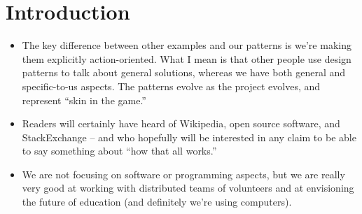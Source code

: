 \section{Introduction}

\begin{itemize}
\item The key difference between other examples and our
patterns is we're making them explicitly action-oriented.  What I mean
is that other people use design patterns to talk about general
solutions, whereas we have both general and specific-to-us aspects.
The patterns evolve as the project evolves, and represent ``skin in the game.''
\item Readers will certainly have heard of Wikipedia, open source
software, and StackExchange -- and who hopefully will be interested in
any claim to be able to say something about ``how that all works.''
\item We are not focusing on software or programming aspects, but we
are really very good at working with distributed teams of volunteers and
at envisioning the future of education (and definitely we're using
computers).
\end{itemize}